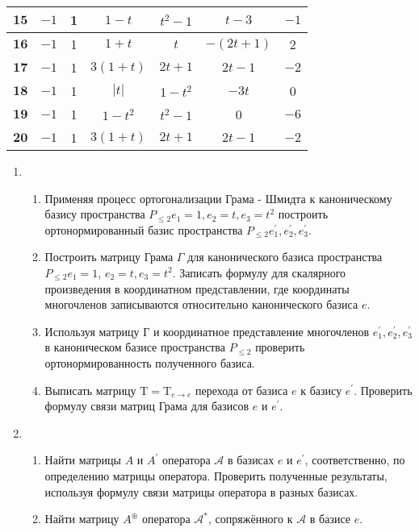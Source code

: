 \documentclass[12pt, a4paper]{article}
\begin{document}
\begin{tabular}{|c|c|c|c|c|c|c|}
    \hline $\mathbf{1 5}$ & $-1$ & 1 & $1-t$ & $t^{2}-1$ & $t-3$ & $-1$ \\
    \hline $\mathbf{1 6}$ & $-1$ & 1 & $1+t$ & $t$ & $-(2 t+1)$ & 2 \\
    \hline $\mathbf{1 7}$ & $-1$ & 1 & $3(1+t)$ & $2 t+1$ & $2 t-1$ & $-2$ \\
    \hline $\mathbf{1 8}$ & $-1$ & 1 & $|t|$ & $1-t^{2}$ & $-3 t$ & 0 \\
    \hline $\mathbf{1 9}$ & $-1$ & 1 & $1-t^{2}$ & $t^{2}-1$ & 0 & $-6$ \\
    \hline $\mathbf{2 0}$ & $-1$ & 1 & $3(1+t)$ & $2 t+1$ & $2 t-1$ & $-2$ \\
    \hline
    \end{tabular}
    
    \begin{enumerate}
        \item \begin{enumerate}
            \item Применяя процесс ортогонализации Грама - Шмидта к каноническому базису пространства $P_{\leq 2} e_{1}=1, e_{2}=t, e_{3}=t^{2}$ построить ортонормированный базис пространства $P_{\leq 2} e_{1}^{\prime}, e_{2}^{\prime}, e_{3}^{\prime}$.
            \item Построить матрицу Грама $\Gamma$ для канонического базиса пространства $P_{\leq 2} e_{1}=1$, $e_{2}=t, e_{3}=t^{2}$. Записать формулу для скалярного произведения в координатном представлении, где координаты многочленов записываются относительно канонического базиса $e$.            
            \item Используя матрицу Г и координатное представление многочленов $e_{1}^{\prime}, e_{2}^{\prime}, e_{3}^{\prime}$ в каноническом базисе пространства $P_{\leq 2}$ проверить ортонормированность полученного базиса.
            \item Выписать матрицу $\mathrm{T}=\mathrm{T}_{e \rightarrow e}$ перехода от базиса $e$ к базису $e^{\prime}$. Проверить формулу связи матриц Грама для базисов $e$ и $e^{\prime}$.
        \end{enumerate}
        \item \begin{enumerate}
            \item Найти матрицы $A$ и $A^{\prime}$ оператора $\mathcal{A}$ в базисах $e$ и $e^{\prime}$, соответственно, по определению матрицы оператора. Проверить полученные результаты, используя формулу связи матрицы оператора в разных базисах.
            \item Найти матрицу $A^{\circledast}$ оператора $\mathcal{A}^{*}$, сопряжённого к $\mathcal{A}$ в базисе $e$. 

\end{enumerate}
\end{enumerate}
\end{document}
